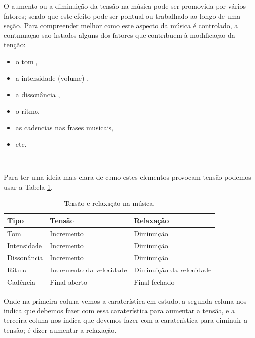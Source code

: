 O aumento ou a diminuição da tensão na música pode ser promovida por vários fatores; 
sendo que este efeito pode ser pontual ou trabalhado ao longo de uma seção.
Para compreender melhor como este aspecto da música  é controlado,
 a continuação são listados alguns dos fatores que contribuem à modificação da tenção:
\begin{itemize}
\item o tom \cite[pp. 3]{wright2012essential},
\item a intensidade (volume) \cite[pp. 3]{wright2012essential},
\item a dissonância \cite[pp. 28-29]{kerman2015listen} \cite[pp. 26]{wright2012essential},
\item o ritmo, 
\item as cadencias nas frases musicais,
\item etc.
\end{itemize}~

Para ter uma ideia mais clara de como estes elementos provocam tensão podemos usar a Tabela  \ref{tab:tensionrelease1}.  
\begin{table}[h]
  \centering
  \begin{tabular}{| p{3cm} || p{3.0cm} | p{3.0cm} |}
   \hline 
   Tipo & Tensão     & Relaxação \\ \hline 
   \hline 
   Tom          & Incremento & Diminuição  \\ \hline
   Intensidade  & Incremento & Diminuição  \\ \hline
   Dissonância  & Incremento & Diminuição  \\ \hline
   Ritmo        & Incremento da velocidade & Diminuição da velocidade \\ \hline
   Cadência     & Final aberto & Final fechado \\ \hline
  \end{tabular}
  \caption{Tensão e relaxação na música.}
  \label{tab:tensionrelease1}
\end{table}
Onde na primeira coluna  vemos a caraterística em estudo,
a segunda coluna nos indica que debemos fazer com essa caraterística para aumentar a tensão,
e a terceira coluna nos indica que devemos fazer com a caraterística para diminuir a tensão;
é dizer aumentar a relaxação.

